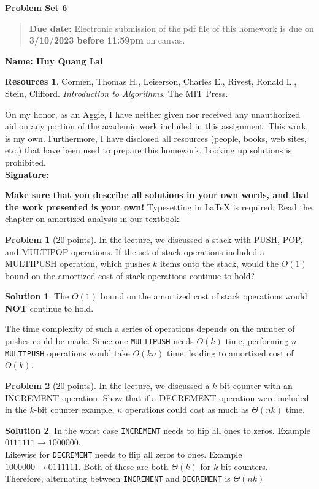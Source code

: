 \documentclass{article}
\theoremstyle{definition}
\newtheorem{problem}{Problem}
\newtheorem*{solution}{Solution}
\newtheorem*{resources}{Resources}
\newcommand{\name}[1]{\noindent\textbf{Name: #1}}
\newcommand{\honor}{\noindent On my honor, as an Aggie, I have neither
  given nor received any unauthorized aid on any portion of the
  academic work included in this assignment. This work is my own. Furthermore, I have
  disclosed all resources (people, books, web sites, etc.) that have
  been used to prepare this homework. Looking up solutions is prohibited. \\[1ex]
 \textbf{Signature:} \underline{\hspace*{5cm}} }
\newcommand{\problemset}[1]{\begin{center}\textbf{Problem Set
      #1}\end{center}}
\newcommand{\duedate}[1]{\begin{quote}\textbf{Due date:} Electronic
    submission of the pdf file of this homework is due on
    \textbf{#1} on canvas. \end{quote} }
\begin{document}
\problemset{6}
\duedate{3/10/2023 before 11:59pm}
\name{ Huy Quang Lai }
\begin{resources} Cormen, Thomas H., Leiserson, Charles E., Rivest, Ronald L., Stein, Clifford. \textit{Introduction to Algorithms}. The MIT Press.
\end{resources}
\honor

\newpage
\textbf{Make sure that you describe all solutions in your own
words, and that the work presented is your own!} Typesetting in
\LaTeX{} is required. Read the chapter on amortized analysis in our textbook. 

\begin{problem}[20 points] In the lecture, we discussed a stack with
  PUSH, POP, and MULTIPOP operations.  If the set of stack operations
  included a MULTIPUSH operation, which pushes $k$ items onto the
  stack, would the $O(1)$ bound on the amortized cost of stack
  operations continue to hold?
\end{problem}
\begin{solution}
The $O(1)$ bound on the amortized cost of stack operations would \textbf{NOT} continue to hold.

\noindent
The time complexity of such a series of operations depends on the number of pushes could be made. Since one \verb+MULTIPUSH+ needs $O(k)$ time, performing $n$ \verb+MULTIPUSH+ operations would take $O(kn)$ time, leading to amortized cost of $O(k)$.
\end{solution}

\begin{problem}[20 points]
  In the lecture, we discussed a $k$-bit counter with an INCREMENT
  operation.  Show that if a DECREMENT operation were included in the $k$-bit
  counter example, $n$ operations could cost as much as $\Theta(nk)$
  time.
\end{problem}
\begin{solution}
In the worst case \verb+INCREMENT+ needs to flip all ones to zeros. Example $0111111\to1000000$.\\
Likewise for \verb+DECREMENT+ needs to flip all zeros to ones. Example $1000000\to0111111$.
Both of these are both $\Theta(k)$ for $k$-bit counters.\\
Therefore, alternating between \verb+INCREMENT+ and \verb+DECREMENT+ is $\Theta(nk)$

\end{solution}
\end{document}
